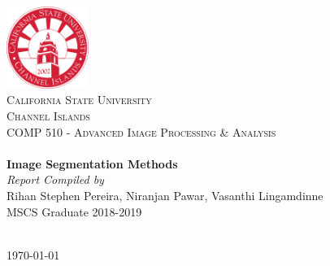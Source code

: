 \begin{titlepage}
\begin{center}
\includegraphics[width=0.20\textwidth]{img/csuci_logo.png}~\\[1cm]

\textsc{\LARGE California State University}\\[0.2cm]
\textsc{\LARGE Channel Islands}\\[1.5cm]

\textsc{\Large COMP 510 - Advanced Image Processing \& Analysis}\\[0.5cm]

\HRule \\[0.4cm]
{ \huge \bfseries Image Segmentation Methods}\\[0.1cm]
{\textit{Report Compiled by}}\\[0.1cm]
{\large {Rihan Stephen Pereira, Niranjan Pawar, Vasanthi Lingamdinne}}\\[0.2cm]
{\Large {MSCS Graduate 2018-2019}}\\[0.2cm]
\HRule \\[1.5cm]


\vfill

{\large \today}
\end{center}
\end{titlepage}

